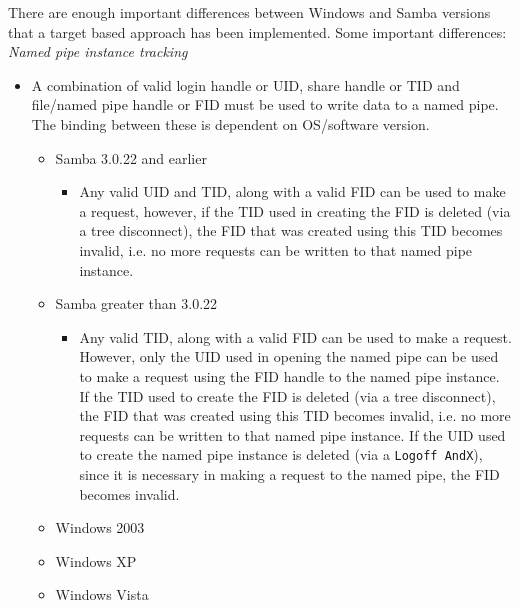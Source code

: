 \documentclass[english]{report}
\begin{document}
There are enough important differences between Windows and Samba versions that
a target based approach has been implemented. Some important differences:\\

\textit{Named pipe instance tracking}

\begin{itemize}

\item[] A combination of valid login handle or UID, share handle or TID and
file/named pipe handle or FID must be used to write data to a named pipe.  The
binding between these is dependent on OS/software version.

\begin{itemize}

\item[] Samba 3.0.22 and earlier

\begin{itemize}

\item[] Any valid UID and TID, along with a valid FID can be used to make a
request, however, if the TID used in creating the FID is deleted (via a tree
disconnect), the FID that was created using this TID becomes invalid, i.e. no
more requests can be written to that named pipe instance.

\end{itemize}

\item[] Samba greater than 3.0.22

\begin{itemize}

\item[] Any valid TID, along with a valid FID can be used to make a request.
However, only the UID used in opening the named pipe can be used to make a
request using the FID handle to the named pipe instance. If the TID used to
create the FID is deleted (via a tree disconnect), the FID that was created
using this TID becomes invalid, i.e. no more requests can be written to that
named pipe instance. If the UID used to create the named pipe instance is
deleted (via a \texttt{Logoff AndX}), since it is necessary in making a request
to the named pipe, the FID becomes invalid.

\end{itemize}

\item[] Windows 2003
\item[] Windows XP
\item[] Windows Vista


\end{itemize}
\end{itemize}
\end{document}
